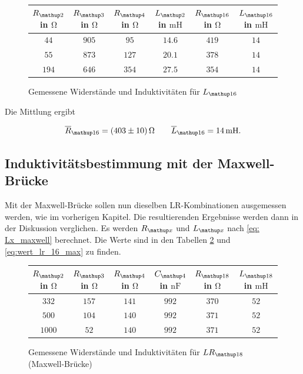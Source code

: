\begin{figure}
\centering
\caption{Gemessene Widerstände und Induktivitäten für $L\ua{16}$}
  \label{tab:lc_r16}
\begin{tabular}{S S S S S S }
    \toprule
    {$R\ua{2}$  in $\si{\ohm}$} &  {$R\ua{3}$ in $\si{\ohm}$} & {$R\ua{4}$ in $\si{\ohm}$} & {$L\ua{2}$ in $\si{\milli\henry}$}& {$R\ua{16}$ in $\si{\ohm}$} &  {$L\ua{16}$ in $\si{\milli\henry}$} \\
    \midrule
     {$\num{44}$} & {$\num{905}$} &  {$\num{95}$}& {$\num{14,6}$}  &  {$\num{419}$} & {$\num{14}$}\\
     {$\num{55}$} & {$\num{873}$}  & {$\num{127}$} & {$\num{20,1}$} & {$\num{378}$} & {$\num{14}$}\\
     {$\num{194}$} & {$\num{646}$}  & {$\num{354}$} & {$\num{27,5}$} &{$\num{354}$} & {$\num{14}$}  \\
    \bottomrule
  \end{tabular}
 \end{figure}

Die Mittlung ergibt

\begin{equation}
\label{eq:wert_r16_l_16}
\overline{R}_{\map{16}}=\SI{403\pm10}{\ohm} \qquad \overline{L}_{\map{16}}=\SI{14}{\milli\henry}.
\end{equation}

\subsection{Induktivitätsbestimmung mit der Maxwell-Brücke}

Mit der Maxwell-Brücke sollen nun dieselben LR-Kombinationen ausgemessen werden, wie %
im vorherigen Kapitel.
Die resultierenden Ergebnisse werden dann in der Diskussion verglichen.
Es werden $R\ua{x}$ und $L\ua{x}$ nach \eqref{eq: Lx_maxwell} berechnet.
Die Werte sind in den Tabellen \ref{tab:lc_r18_max} und \ref{eq:wert_lr_16_max} zu finden.

\begin{figure}
\centering
\caption{Gemessene Widerstände und Induktivitäten für $LR\ua{18}$ (Maxwell-Brücke)}
  \label{tab:lc_r18_max}
\begin{tabular}{S S S S S S }
    \toprule
    {$R\ua{2}$  in $\si{\ohm}$} &  {$R\ua{3}$ in $\si{\ohm}$} & {$R\ua{4}$ in $\si{\ohm}$} & {$C\ua{4}$ in $\si{\nano\farad}$}& {$R\ua{18}$ in $\si{\ohm}$} &  {$L\ua{18}$ in $\si{\milli\henry}$} \\
    \midrule
     {$\num{332}$} & {$\num{157}$} &  {$\num{141}$}& {$\num{992}$}  &  {$\num{370}$} & {$\num{52}$}\\
     {$\num{500}$} & {$\num{104}$}  & {$\num{140}$} & {$\num{992}$} & {$\num{371}$} & {$\num{52}$}\\
     {$\num{1000}$} & {$\num{52}$}  & {$\num{140}$} & {$\num{992}$} &{$\num{371}$} & {$\num{52}$}  \\
    \bottomrule
  \end{tabular}
 \end{figure}


